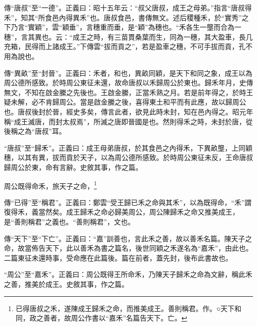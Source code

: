 {\noindent\zhuan{}\fzbyks 傳“唐叔”至“一德”。正義曰：昭十五年云：“叔父唐叔，成王之母弟。”指言“唐叔得禾”，知其“所食邑內得異禾”也。唐叔食邑，書傳無文。述后稷種禾，於“實秀”之下乃言“實穎”，雲“穎垂”，言穗重而垂，是“穎”為穗也。“禾各生一壟而合為一穗”，言其異也。云：“成王之時，有三苗貫桑葉而生，同為一穗，其大盈車，長几充箱，民得而上諸成王。”下傳雲“拔而貢之”，若是盈車之穗，不可手拔而貢，孔不用為說也。 \par}

{\noindent\zhuan{}\fzbyks 傳“異畝”至“封晉”。正義曰：禾者，和也，異畝同穎，是天下和同之象，成王以為周公德所感致。於時周公東征未還，故命唐叔以禾歸周公於東也。歸禾年月，史傳無文，不知在啟金縢之先後也。王啟金縢，正當禾熟之月。若是前年得之，於時王疑未解，必不肯歸周公。當是啟金縢之後，喜得東土和平而有此應，故以歸周公也。唐叔後封於晉，經史多矣，傳言此者，欲見此時未封，知在邑內得之。昭元年稱“成王滅唐，而封太叔焉”，所滅之唐即晉國是也。然則得禾之時，未封於唐，從後稱之為“唐叔”耳。 \par}

{\noindent\shu{}\fzkt “唐叔”至“歸禾”。正義曰：成王母弟唐叔，於其食邑之內得禾，下異畝壟，上同穎穗，以其有異，拔而貢於天子，以為周公德所感致。於時周公東征未反，王命唐叔歸周公於東，命有言辭。史敘其事，作之篇。 \par}

周公既得命禾，旅天子之命，\footnote{已得唐叔之禾，遂陳成王歸禾之命，而推美成王。善則稱君。作。○天下和同，政之善者，故周公作書以“嘉禾”名篇告天下。亡。}

{\noindent\zhuan{}\fzbyks 傳“已得”至“稱君”。正義曰：鄭雲“受王歸已禾之命與其禾”，以為既得命，“禾”謂復得禾，義當然矣。成王歸禾之命必歸美周公，周公陳歸禾之命又推美成王，是“善則稱君”之義也。“善則稱君”，文也。 \par}

{\noindent\zhuan{}\fzbyks 傳“天下”至“下亡”。正義曰：“嘉”訓善也，言此禾之善，故以善禾名篇。陳天子之命，故當佈告天下，此以善禾為書之篇名，後世同穎之禾遂名為“嘉禾”，由此也。二篇東征未還時事，受命應在此篇後。篇在前者，蓋先封，後布此書故也。 \par}

{\noindent\shu{}\fzkt “周公”至“嘉禾”。正義曰：周公既得王所命禾，乃陳天子歸禾之命為文辭，稱此禾之善，推美於成王。史敘其事，作之篇。 \par}

